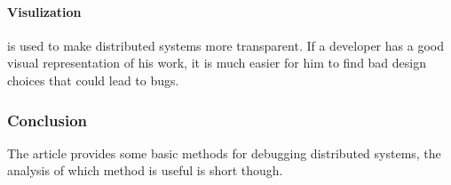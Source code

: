 \paragraph{Visulization} is used to make distributed systems more transparent. If a developer has a good visual representation of his work, it is much easier for him to find bad design choices that could lead to bugs.

\subsubsection{Conclusion}
The article provides some basic methods for debugging distributed systems, the analysis of which method is useful is short though.
